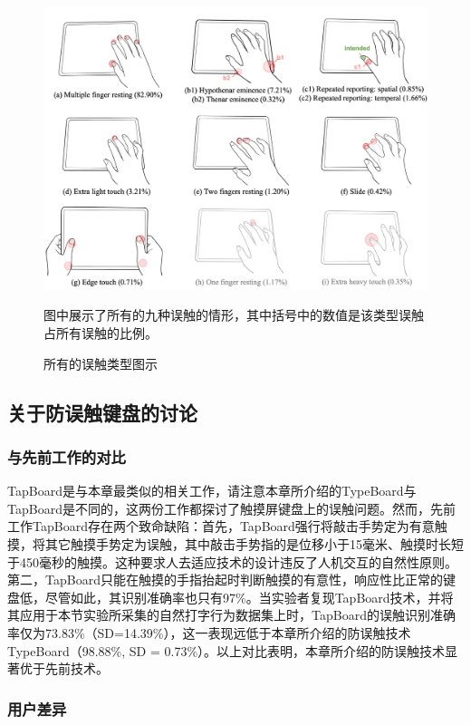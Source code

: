 \begin{figure}[!tbh]
	\includegraphics[width=1.0\linewidth]{figures/TypeBoard_unintentional_touch.png}
	\centering
	\caption*{图中展示了所有的九种误触的情形，其中括号中的数值是该类型误触占所有误触的比例。}
	\caption{所有的误触类型图示}
	\label{fig:TypeBoard_unintentional_touch}
\end{figure}

\subsection{关于防误触键盘的讨论}

\subsubsection{与先前工作的对比}

TapBoard\cite{2013-TapBoard}是与本章最类似的相关工作，请注意本章所介绍的TypeBoard与TapBoard是不同的，这两份工作都探讨了触摸屏键盘上的误触问题。然而，先前工作TapBoard存在两个致命缺陷：首先，TapBoard强行将敲击手势定为有意触摸，将其它触摸手势定为误触，其中敲击手势指的是位移小于15毫米、触摸时长短于450毫秒的触摸。这种要求人去适应技术的设计违反了人机交互的自然性原则。第二，TapBoard只能在触摸的手指抬起时判断触摸的有意性，响应性比正常的键盘低，尽管如此，其识别准确率也只有97\%。当实验者复现TapBoard技术，并将其应用于本节实验所采集的自然打字行为数据集上时，TapBoard的误触识别准确率仅为73.83\%（SD=14.39\%），这一表现远低于本章所介绍的防误触技术TypeBoard（98.88\%, SD = 0.73\%）。以上对比表明，本章所介绍的防误触技术显著优于先前技术。

\subsubsection{用户差异}

